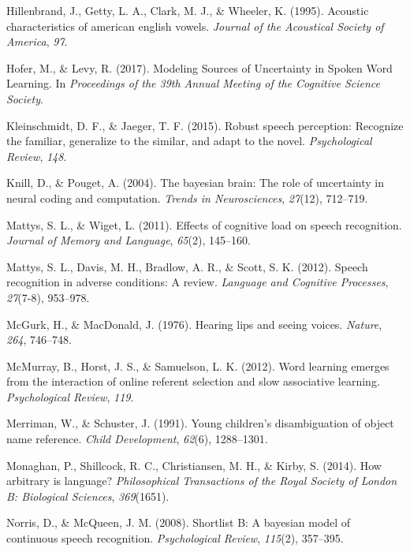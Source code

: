 \documentclass[english,man]{apa6}
\theoremstyle{definition}
\theoremstyle{definition}
\theoremstyle{definition}
\theoremstyle{remark}
\begin{document}
\hypertarget{ref-hillenbrand1995}{}
Hillenbrand, J., Getty, L. A., Clark, M. J., \& Wheeler, K. (1995).
Acoustic characteristics of american english vowels. \emph{Journal of
the Acoustical Society of America}, \emph{97}.

\hypertarget{ref-hofer2017}{}
Hofer, M., \& Levy, R. (2017). Modeling Sources of Uncertainty in Spoken
Word Learning. In \emph{Proceedings of the 39th Annual Meeting of the
Cognitive Science Society}.

\hypertarget{ref-kleinschmidt2015}{}
Kleinschmidt, D. F., \& Jaeger, T. F. (2015). Robust speech perception:
Recognize the familiar, generalize to the similar, and adapt to the
novel. \emph{Psychological Review}, \emph{148}.

\hypertarget{ref-Knill04}{}
Knill, D., \& Pouget, A. (2004). The bayesian brain: The role of
uncertainty in neural coding and computation. \emph{Trends in
Neurosciences}, \emph{27}(12), 712--719.

\hypertarget{ref-mattys11}{}
Mattys, S. L., \& Wiget, L. (2011). Effects of cognitive load on speech
recognition. \emph{Journal of Memory and Language}, \emph{65}(2),
145--160.

\hypertarget{ref-mattys12}{}
Mattys, S. L., Davis, M. H., Bradlow, A. R., \& Scott, S. K. (2012).
Speech recognition in adverse conditions: A review. \emph{Language and
Cognitive Processes}, \emph{27}(7-8), 953--978.

\hypertarget{ref-mcgurk1976}{}
McGurk, H., \& MacDonald, J. (1976). Hearing lips and seeing voices.
\emph{Nature}, \emph{264}, 746--748.

\hypertarget{ref-mcmurray2012}{}
McMurray, B., Horst, J. S., \& Samuelson, L. K. (2012). Word learning
emerges from the interaction of online referent selection and slow
associative learning. \emph{Psychological Review}, \emph{119}.

\hypertarget{ref-Merriman91}{}
Merriman, W., \& Schuster, J. (1991). Young children's disambiguation of
object name reference. \emph{Child Development}, \emph{62}(6),
1288--1301.

\hypertarget{ref-Monaghan2014}{}
Monaghan, P., Shillcock, R. C., Christiansen, M. H., \& Kirby, S.
(2014). How arbitrary is language? \emph{Philosophical Transactions of
the Royal Society of London B: Biological Sciences}, \emph{369}(1651).

\hypertarget{ref-Norris08}{}
Norris, D., \& McQueen, J. M. (2008). Shortlist B: A bayesian model of
continuous speech recognition. \emph{Psychological Review},
\emph{115}(2), 357--395.
\end{document}

